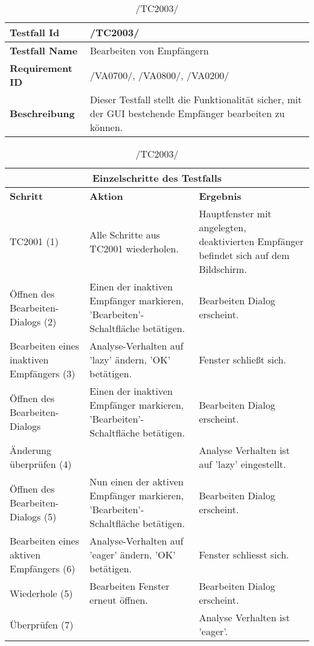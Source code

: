 \begin{table}[h]
\caption{/TC2003/}
\label{tab:TC2003}
\begin{center}
\begin{tabular}{|p{3.5cm}|p{12cm}|}
\hline
\textbf{Testfall Id} & /TC2003/\\
\hline
\textbf{Testfall Name} & Bearbeiten von Empfängern\\
\hline
\textbf{Requirement ID} & /VA0700/, /VA0800/, /VA0200/\\
\hline
\textbf{Beschreibung} & Dieser Testfall stellt die Funktionalität sicher, mit
der GUI bestehende Empfänger bearbeiten zu können.\\
\hline
\end{tabular}
\begin{tabular}{|p{2.5cm}|p{5cm}|p{7.55cm}|}
\multicolumn{3}{|c|}{\textbf{Einzelschritte des Testfalls}} \\
\hline
\textbf{Schritt} & \textbf{Aktion} & \textbf{Ergebnis}\\
\hline
TC2001 (1)& Alle Schritte aus TC2001 wiederholen. & Hauptfenster mit angelegten,
deaktivierten Empfänger befindet sich auf dem Bildschirm.\\
\hline
Öffnen des Bearbeiten-Dialogs (2) & Einen der inaktiven Empfänger markieren,
'Bearbeiten'-Schaltfläche betätigen. & Bearbeiten Dialog erscheint.\\
\hline
Bearbeiten eines inaktiven Empfängers (3) & Analyse-Verhalten auf 'lazy' ändern,
'OK' betätigen. & Fenster schließt sich.\\
\hline
Öffnen des Bearbeiten-Dialogs & Einen der inaktiven Empfänger markieren,
'Bearbeiten'-Schaltfläche betätigen. & Bearbeiten Dialog erscheint.\\
\hline
Änderung überprüfen (4) & & Analyse Verhalten ist auf 'lazy' eingestellt.\\
\hline
Öffnen des Bearbeiten-Dialogs (5) & Nun einen der aktiven Empfänger markieren,
'Bearbeiten'-Schaltfläche betätigen. & Bearbeiten Dialog erscheint.\\
\hline
Bearbeiten eines aktiven Empfängers (6) & Analyse-Verhalten auf 'eager' ändern,
'OK' betätigen. & Fenster schliesst sich.\\
\hline
Wiederhole (5) & Bearbeiten Fenster erneut öffnen. & Bearbeiten Dialog erscheint.\\
\hline
Überprüfen (7) & & Analyse Verhalten ist 'eager'.\\
\hline
\end{tabular}
\end{center}
\label{default}
\end{table}

